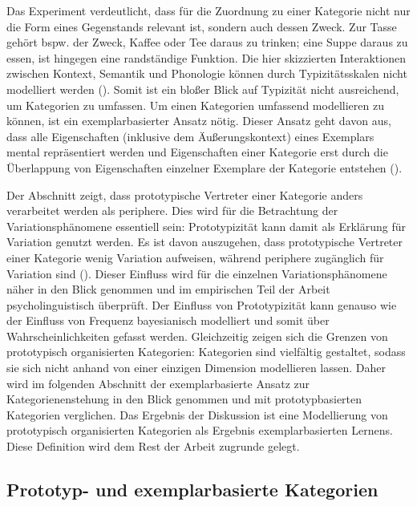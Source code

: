 Das Experiment verdeutlicht, dass für die Zuordnung zu einer Kategorie nicht nur die Form eines Gegenstands relevant ist, sondern auch dessen Zweck. Zur Tasse gehört bspw. der Zweck, Kaffee oder Tee daraus zu trinken; eine Suppe daraus zu essen, ist hingegen eine randständige Funktion. Die hier skizzierten Interaktionen zwischen Kontext, Semantik und Phonologie können durch Typizitätsskalen nicht modelliert werden (\cite[2--3]{Poitou.2004b}). Somit ist ein bloßer Blick auf Typizität nicht ausreichend, um Kategorien zu umfassen. Um einen Kategorien umfassend modellieren zu können, ist ein exemplarbasierter Ansatz nötig. Dieser Ansatz geht davon aus, dass alle Eigenschaften (inklusive dem Äußerungskontext) eines Exemplars mental repräsentiert werden und Eigenschaften einer Kategorie erst durch die Überlappung von Eigenschaften einzelner Exemplare der Kategorie entstehen (\cite[62--73]{Goldberg.2019}).

Der Abschnitt zeigt, dass prototypische Vertreter einer Kategorie anders verarbeitet werden als periphere. Dies wird für die Betrachtung der Variationsphänomene essentiell sein: Prototypizität kann damit als Erklärung für Variation genutzt werden. Es ist davon auszugehen, dass prototypische Vertreter einer Kategorie wenig Variation aufweisen, während periphere zugänglich für Variation sind (\cite[67--68]{Agel.2008}). Dieser Einfluss wird für die einzelnen Variationsphänomene näher in den Blick genommen und im empirischen Teil der Arbeit psycholinguistisch überprüft. Der Einfluss von Prototypizität kann genauso wie der Einfluss von Frequenz bayesianisch modelliert und somit über Wahrscheinlichkeiten gefasst werden. Gleichzeitig zeigen sich die Grenzen von prototypisch organisierten Kategorien: Kategorien sind vielfältig gestaltet, sodass sie sich nicht anhand von einer einzigen Dimension modellieren lassen. Daher wird im folgenden Abschnitt der exemplarbasierte Ansatz zur Kategorienenstehung in den Blick genommen und mit prototyp\-basierten Kategorien verglichen. Das Ergebnis der Diskussion ist eine Modellierung von prototypisch organisierten Kategorien als Ergebnis exemplarbasierten Lernens. Diese Definition wird dem Rest der Arbeit zugrunde gelegt.

\subsection{Prototyp- und exemplarbasierte Kategorien}
\label{exemplar}
 

